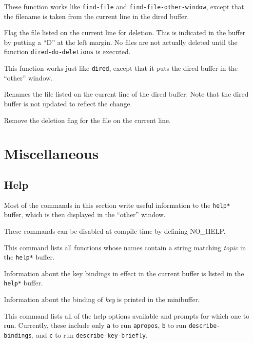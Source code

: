 \fbody These function works like {\tt find-file} and 
{\tt find-file-other-window}, except that the filename is taken 
from the current line in the dired buffer.

\fbody Flag the file listed on the current line for deletion.  This is
indicated in the buffer by putting a ``D'' at the left margin.  No
files are not actually deleted until the function {\tt dired-do-deletions}
is executed.

\fbody This function works just like {\tt dired}, except that it puts the
dired buffer in the ``other'' window.

\fbody Renames the file listed on the current line of the dired buffer.  
Note that the dired buffer is not updated to reflect the change.

\fbody Remove the deletion flag for the file on the current line.

\chapter{Miscellaneous}

\section{Help}

Most of the commands in this section write useful information to the
{\tt *help*} buffer, which is then displayed in the ``other'' window.

These commands can be disabled at compile-time by defining NO\_HELP.

\fbody This command lists all functions whose names contain a string
matching {\em topic\/} in the {\tt *help*} buffer.

\fbody Information about the key bindings in effect in the current buffer
is listed in the {\tt *help*} buffer.

\fbody Information about the binding of {\em key\/} is printed in the
minibuffer.

\fbody This command lists all of the help options available and
prompts for which one to run.  Currently, these include only {\tt a}
to run {\tt apropos}, {\tt b} to run {\tt describe-bindings}, and {\tt c}
to run {\tt describe-key-briefly}.


